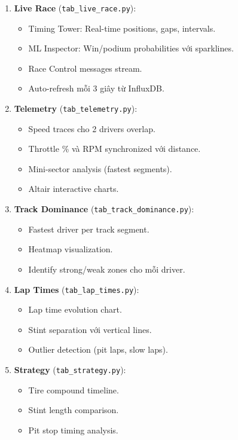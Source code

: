 \documentclass[conference,10pt]{IEEEtran}
\begin{document}
\begin{enumerate}
    \item \textbf{Live Race} (\texttt{tab\_live\_race.py}):
    \begin{itemize}
        \item Timing Tower: Real-time positions, gaps, intervals.
        \item ML Inspector: Win/podium probabilities với sparklines.
        \item Race Control messages stream.
        \item Auto-refresh mỗi 3 giây từ InfluxDB.
    \end{itemize}

    \item \textbf{Telemetry} (\texttt{tab\_telemetry.py}):
    \begin{itemize}
        \item Speed traces cho 2 drivers overlap.
        \item Throttle \% và RPM synchronized với distance.
        \item Mini-sector analysis (fastest segments).
        \item Altair interactive charts.
    \end{itemize}

    \item \textbf{Track Dominance} (\texttt{tab\_track\_dominance.py}):
    \begin{itemize}
        \item Fastest driver per track segment.
        \item Heatmap visualization.
        \item Identify strong/weak zones cho mỗi driver.
    \end{itemize}

    \item \textbf{Lap Times} (\texttt{tab\_lap\_times.py}):
    \begin{itemize}
        \item Lap time evolution chart.
        \item Stint separation với vertical lines.
        \item Outlier detection (pit laps, slow laps).
    \end{itemize}

    \item \textbf{Strategy} (\texttt{tab\_strategy.py}):
    \begin{itemize}
        \item Tire compound timeline.
        \item Stint length comparison.
        \item Pit stop timing analysis.
    \end{itemize}


\end{enumerate}
\end{document}
